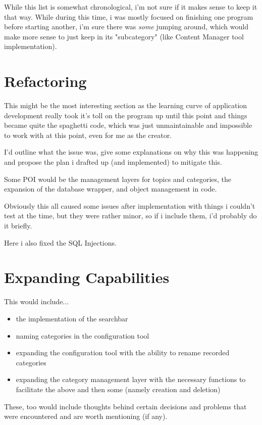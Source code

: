 While this list is somewhat chronological, i'm not sure if it makes sense to keep it that way. While during this time, i was mostly focused on finishing one program before starting another, i'm sure there was \textit{some} jumping around, which would make more sense to just keep in its "subcategory" (like Content Manager tool implementation).

\section{Refactoring}

This might be the most interesting section as the learning curve of application development really took it's toll on the program up until this point and things became quite the spaghetti code, which was just unmaintainable and impossible to work with at this point, even for me as the creator.

I'd outline what the issue was, give some explanations on why this was happening and propose the plan i drafted up (and implemented) to mitigate this.

Some POI would be the management layers for topics and categories, the expansion of the database wrapper, and object management in code.

Obviously this all caused some issues after implementation with things i couldn't test at the time, but they were rather minor, so if i include them, i'd probably do it briefly.

Here i also fixed the SQL Injections.

\section{Expanding Capabilities}

This would include...

\begin{itemize}
	\item the implementation of the searchbar
	\item naming categories in the configuration tool
	\item expanding the configuration tool with the ability to rename recorded categories
	\item expanding the category management layer with the necessary functions to facilitate the above and then some (namely creation and deletion)
\end{itemize}

These, too would include thoughts behind certain decisions and problems that were encountered and are worth mentioning (if any).

